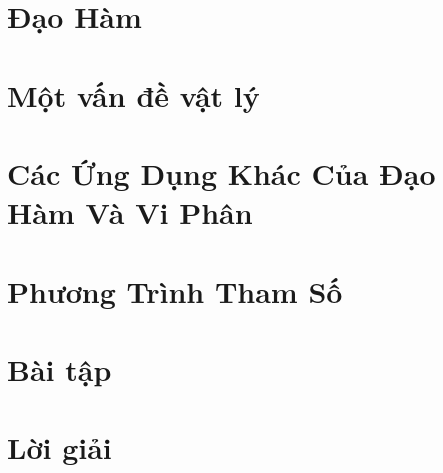 \section{Đạo Hàm}

\section{Một vấn đề vật lý}

\section{Các Ứng Dụng Khác Của Đạo Hàm Và Vi Phân}

\section{Phương Trình Tham Số}

\section{Bài tập}

\section{Lời giải }


\begin{refsection}
\nocite{cack,engineeringHob,danko,calculusjame,demical}
\printbibliography
\end{refsection}


